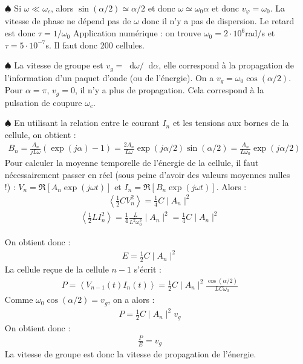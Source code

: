 \documentclass{report}
\newcommand*\dif{\mathop{}\!\mathrm{d}}
\begin{document}
\begin{itemize}
	\item[$\spadesuit$] Si $\omega\ll\omega_c$, alors $\sin(\alpha/2)\simeq\alpha/2$ et donc $\omega\simeq\omega_0\alpha$ et donc $v_\varphi=\omega_0$. La vitesse de phase ne dépend pas de $\omega$ donc il n'y a pas de dispersion. Le retard est donc $\tau=1/\omega_0$ Application numérique : on trouve $\omega_0=2\cdot10^6$rad/s et $\tau=5\cdot10^{-7}$s. Il faut donc 200 cellules. 

	\item[$\spadesuit$] La vitesse de groupe est $v_g=\dif \omega /\dif \alpha$, elle correspond à la propagation de l'information d'un paquet d'onde (ou de l'énergie). On a $v_g=\omega_0\cos(\alpha/2)$. Pour $\alpha=\pi$, $v_g=0$, il n'y a plus de propagation. Cela correspond à la pulsation de coupure $\omega_c$.
	
	\item[$\spadesuit$] En utilisant la relation entre le courant $I_n$ et les tensions aux bornes de la cellule, on obtient :
\begin{align*}
	B_n=\frac{A_n}{jL\omega}(\exp(j\alpha)-1)=\frac{2A_n}{L\omega}\exp(j\alpha/2)\sin(\alpha/2)=\frac{A_n}{L\omega_0}\exp(j\alpha/2)
\end{align*}	
	 Pour calculer la moyenne temporelle de l'énergie de la cellule, il faut nécessairement passer en réel (sous peine d'avoir des valeurs moyennes nulles !) : $V_n=\Re[A_n\exp(j\omega t)]$ et $I_n=\Re[B_n\exp(j\omega t)]$. Alors :
	   	\begin{align*}
	   		\left\langle\frac{1}{2}CV_n^2 \right\rangle =\frac{1}{4}C\mid A_n\mid^2
	   	\end{align*}
	    \begin{align*}
	   		\left\langle\frac{1}{2}LI_n^2 \right\rangle =\frac{1}{4}\frac{L}{L^2\omega_0^2}\mid A_n\mid^2=\frac{1}{4}C\mid A_n\mid^2
	   	\end{align*}
	   	
	   	On obtient donc :
	   	\begin{align*}
	   		E=\frac{1}{2}C\mid A_n\mid^2
	   	\end{align*}
	   	La cellule reçue de la cellule $n-1$ s'écrit :
	   	\begin{align*}
	   		P=\left\langle V_{n-1}(t)I_n(t) \right\rangle =\frac{1}{2}C\mid A_n\mid^2\frac{\cos(\alpha/2)}{LC\omega_0}
	   	\end{align*}
	   	Comme $\omega_0\cos(\alpha/2)=v_g$, on a alors :
	   	\begin{align*}
	   		P=\frac{1}{2}C\mid A_n\mid^2v_g
	   	\end{align*}
	   	On obtient donc :
	   	\begin{align*}
	   		\frac{P}{E}=v_g
	   	\end{align*}
	   	La vitesse de groupe est donc la vitesse de propagation de l'énergie. 

\end{itemize}
\end{document}
